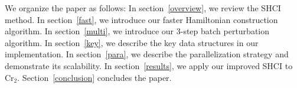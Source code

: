 \documentclass[%
preprint,
 superscriptaddress,
 amsmath,amssymb,
 aps,
]{revtex4-1}
\begin{document}


We organize the paper as follows:
In section~\ref{overview}, we review the SHCI method.
In section~\ref{fast}, we introduce our faster Hamiltonian construction algorithm.
In section~\ref{multi}, we introduce our 3-step batch perturbation algorithm.
In section~\ref{key}, we describe the key data structures in our implementation.
In section~\ref{para}, we describe the parallelization strategy and demonstrate its scalability.
In section~\ref{results}, we apply our improved SHCI to Cr$_2$.
Section~\ref{conclusion} concludes the paper.


\end{document}
